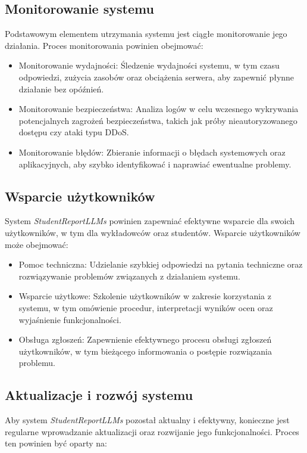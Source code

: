 \documentclass[a4paper, 12pt]{article}
\begin{document}
\subsection{Monitorowanie systemu}

Podstawowym elementem utrzymania systemu jest ciągłe monitorowanie jego działania. Proces monitorowania powinien obejmować:

\begin{itemize}
\item Monitorowanie wydajności: Śledzenie wydajności systemu, w tym czasu odpowiedzi, zużycia zasobów oraz obciążenia serwera, aby zapewnić płynne działanie bez opóźnień.
\item Monitorowanie bezpieczeństwa: Analiza logów w celu wczesnego wykrywania potencjalnych zagrożeń bezpieczeństwa, takich jak próby nieautoryzowanego dostępu czy ataki typu DDoS.
\item Monitorowanie błędów: Zbieranie informacji o błędach systemowych oraz aplikacyjnych, aby szybko identyfikować i naprawiać ewentualne problemy.
\end{itemize}

\subsection{Wsparcie użytkowników}

System \textit{StudentReportLLMs} powinien zapewniać efektywne wsparcie dla swoich użytkowników, w tym dla wykładowców oraz studentów. Wsparcie użytkowników może obejmować:

\begin{itemize}
\item Pomoc techniczna: Udzielanie szybkiej odpowiedzi na pytania techniczne oraz rozwiązywanie problemów związanych z działaniem systemu.
\item Wsparcie użytkowe: Szkolenie użytkowników w zakresie korzystania z systemu, w tym omówienie procedur, interpretacji wyników ocen oraz wyjaśnienie funkcjonalności.
\item Obsługa zgłoszeń: Zapewnienie efektywnego procesu obsługi zgłoszeń użytkowników, w tym bieżącego informowania o postępie rozwiązania problemu.
\end{itemize}

\subsection{Aktualizacje i rozwój systemu}

Aby system \textit{StudentReportLLMs} pozostał aktualny i efektywny, konieczne jest regularne wprowadzanie aktualizacji oraz rozwijanie jego funkcjonalności. Proces ten powinien być oparty na:
\end{document}
